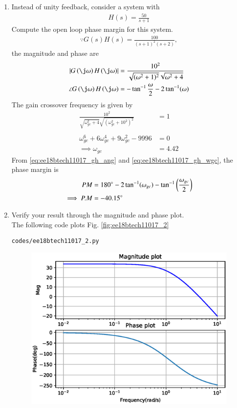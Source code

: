 \begin{enumerate}[label=\thesection.\arabic*.,ref=\thesection.\theenumi]
\item Instead of unity feedback, consider a system with 
%
\begin{align}
H(s)=\frac{50}{s+1}
\end{align}
%
Compute the open loop phase margin for this system.
\\
\solution 
%
\begin{align}
\because G(s)H(s)=\frac{100}{(s+1)^{2}(s+2)},
\label{eq:ee18btech11017_gh}
\end{align}
%
the  magnitude and phase are
\begin{align}
\label{eq:ee18btech11017_gh_mag}
\abs{G\brak{\j\omega}H\brak{\j\omega}}&=\frac{10^{2}}{ \sqrt{(\omega^{2}+1)^{2}}
\sqrt{\omega^{2}+4}} \\
\angle G\brak{\j\omega}H\brak{\j\omega}&=-\tan^{-1}\frac{\omega}{2}-2\tan^{-1}(\omega) 
\label{eq:ee18btech11017_gh_ang}
\end{align}
%
The gain crossover frequency is given by 
\begin{align}
\frac{10^{2}}{\sqrt{\omega_{gc}^{2}+4} \sqrt{(\omega_{gc}^{2}+10^{2})^{2}}}&=1 \\
\\
\omega_{gc}^{6}+6\omega_{gc}^{4}+9\omega_{gc}^{2}-9996&=0 
\\
\implies \omega_{gc} &= 4.42  
\label{eq:ee18btech11017_gh_wgc}
\end{align}
%
From \eqref{eq:ee18btech11017_gh_ang} and \eqref{eq:ee18btech11017_gh_wgc},
the phase margin is
\begin{align}
PM &=180\degree-2\tan^{-1}(\omega_{gc})-\tan^{-1}\left(\frac{\omega_{gc}}{2}\right) \\
\implies  P.M &=-40.15\degree
\label{eq:ee18btech11017_gh_pm}
\end{align}
\item Verify your result through the magnitude and phase plot.
\\
\solution The following code plots Fig. \ref{fig:ee18btech11017_2}
\begin{lstlisting}
codes/ee18btech11017_2.py
\end{lstlisting}
\begin{figure}[!h]
  \includegraphics[width=\columnwidth]{./figs/ee18btech11017/ee18btech11017_2.eps}

\end{figure}
\end{enumerate}
